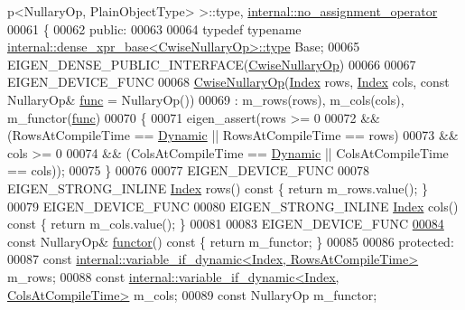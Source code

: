 \begin{DoxyCode}
      p<NullaryOp, PlainObjectType> >::type, \hyperlink{class_eigen_1_1internal_1_1no__assignment__operator}{internal::no\_assignment\_operator}
00061 \{
00062   \textcolor{keyword}{public}:
00063 
00064     \textcolor{keyword}{typedef} \textcolor{keyword}{typename} \hyperlink{struct_eigen_1_1internal_1_1dense__xpr__base}{internal::dense\_xpr\_base<CwiseNullaryOp>::type}
       Base;
00065     EIGEN\_DENSE\_PUBLIC\_INTERFACE(\hyperlink{group___core___module_class_eigen_1_1_cwise_nullary_op}{CwiseNullaryOp})
00066 
00067     EIGEN\_DEVICE\_FUNC
00068     \hyperlink{group___core___module_class_eigen_1_1_cwise_nullary_op}{CwiseNullaryOp}(\hyperlink{namespace_eigen_a62e77e0933482dafde8fe197d9a2cfde}{Index} rows, \hyperlink{namespace_eigen_a62e77e0933482dafde8fe197d9a2cfde}{Index} cols, \textcolor{keyword}{const} NullaryOp& 
      \hyperlink{structfunc}{func} = NullaryOp())
00069       : m\_rows(rows), m\_cols(cols), m\_functor(\hyperlink{structfunc}{func})
00070     \{
00071       eigen\_assert(rows >= 0
00072             && (RowsAtCompileTime == \hyperlink{namespace_eigen_ad81fa7195215a0ce30017dfac309f0b2}{Dynamic} || RowsAtCompileTime == rows)
00073             &&  cols >= 0
00074             && (ColsAtCompileTime == \hyperlink{namespace_eigen_ad81fa7195215a0ce30017dfac309f0b2}{Dynamic} || ColsAtCompileTime == cols));
00075     \}
00076 
00077     EIGEN\_DEVICE\_FUNC
00078     EIGEN\_STRONG\_INLINE \hyperlink{namespace_eigen_a62e77e0933482dafde8fe197d9a2cfde}{Index} rows()\textcolor{keyword}{ const }\{ \textcolor{keywordflow}{return} m\_rows.value(); \}
00079     EIGEN\_DEVICE\_FUNC
00080     EIGEN\_STRONG\_INLINE \hyperlink{namespace_eigen_a62e77e0933482dafde8fe197d9a2cfde}{Index} cols()\textcolor{keyword}{ const }\{ \textcolor{keywordflow}{return} m\_cols.value(); \}
00081 
00083     EIGEN\_DEVICE\_FUNC
\hyperlink{group___core___module_abef8b2e7bcbcfa98c49caf0a1391ee47}{00084}     \textcolor{keyword}{const} NullaryOp& \hyperlink{group___core___module_abef8b2e7bcbcfa98c49caf0a1391ee47}{functor}()\textcolor{keyword}{ const }\{ \textcolor{keywordflow}{return} m\_functor; \}
00085 
00086   \textcolor{keyword}{protected}:
00087     \textcolor{keyword}{const} \hyperlink{class_eigen_1_1internal_1_1variable__if__dynamic}{internal::variable\_if\_dynamic<Index, RowsAtCompileTime>}
       m\_rows;
00088     \textcolor{keyword}{const} \hyperlink{class_eigen_1_1internal_1_1variable__if__dynamic}{internal::variable\_if\_dynamic<Index, ColsAtCompileTime>}
       m\_cols;
00089     \textcolor{keyword}{const} NullaryOp m\_functor;

\end{DoxyCode}
